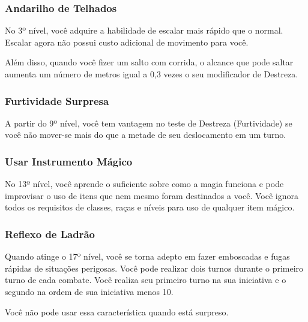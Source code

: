 \documentclass{RPG_Adventure}[2021/10/20]
\begin{document}
\begin{multicols}{2}
\subsubsection{Andarilho de Telhados}%

No 3º nível, você adquire a habilidade de escalar mais rápido que o normal.
Escalar agora não possui custo adicional de movimento para você.

Além disso, quando você fizer um salto com corrida, o alcance que pode saltar
aumenta um número de metros igual a 0,3 vezes o seu modificador de Destreza.

\subsubsection{Furtividade Surpresa}%

A partir do 9º nível, você tem vantagem no teste de Destreza (Furtividade) se
você não mover-se mais do que a metade de seu deslocamento em um turno.

\subsubsection{Usar Instrumento Mágico}%

 No 13º nível, você aprende o suficiente sobre como a magia funciona e pode
 improvisar o uso de itens que nem mesmo foram destinados a você. Você ignora
 todos os requisitos de classes, raças e níveis para uso de qualquer item
 mágico.

\subsubsection{Reflexo de Ladrão}%

Quando atinge o 17º nível, você se torna adepto em fazer emboscadas e fugas
rápidas de situações perigosas. Você pode realizar dois turnos durante o
primeiro turno de cada combate. Você realiza seu primeiro turno na sua
iniciativa e o segundo na ordem de sua iniciativa menos 10.

Você não pode usar essa característica quando está surpreso.
\end{multicols}

\end{document}
